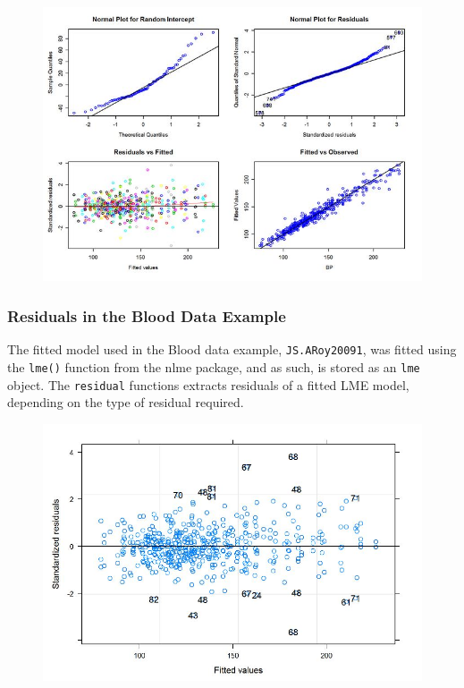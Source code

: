 \documentclass[12pt, a4paper]{report}
\theoremstyle{plain}
\theoremstyle{definition}
\theoremstyle{remark}
\begin{document}
	\begin{figure}[h!]
		\centering
		\includegraphics[width=0.9\linewidth]{images/ResidPlot}
		\caption{}
		\label{fig:ResidPlot}
	\end{figure}


	
	
	\subsubsection{Residuals in the Blood Data Example}
	The fitted model used in the Blood data example, \texttt{JS.ARoy20091}, was fitted using the \texttt{lme()} function from the nlme package, and as such, is stored as an \texttt{lme} object. The \texttt{residual} functions extracts residuals of a fitted LME model, depending on the type of residual required.
	
	\begin{figure}[h!]
		\centering
		\includegraphics[width=0.9\linewidth]{images/Residuals-JS-roy}
		\caption{}
		\label{fig:Residuals-JS-ARoy2009}
	\end{figure}
	
\end{document}
